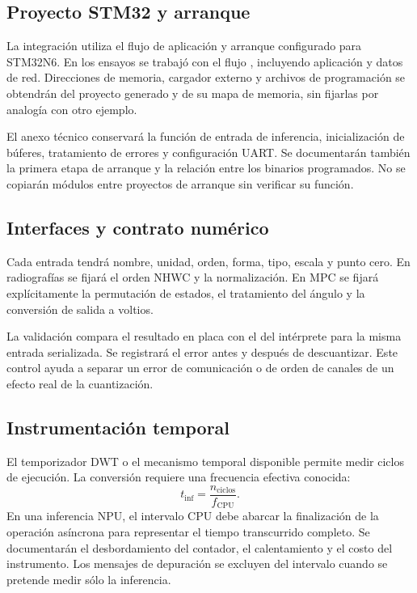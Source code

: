 \subsection{Proyecto STM32 y arranque}
La integración utiliza el flujo de aplicación y arranque configurado para STM32N6. En los ensayos se trabajó con el flujo , incluyendo aplicación y datos de red. Direcciones de memoria, cargador externo y archivos de programación se obtendrán del proyecto generado y de su mapa de memoria, sin fijarlas por analogía con otro ejemplo.

El anexo técnico conservará la función de entrada de inferencia, inicialización de búferes, tratamiento de errores y configuración UART. Se documentarán también la primera etapa de arranque y la relación entre los binarios programados. No se copiarán módulos entre proyectos de arranque sin verificar su función.

\subsection{Interfaces y contrato numérico}
Cada entrada tendrá nombre, unidad, orden, forma, tipo, escala y punto cero. En radiografías se fijará el orden NHWC y la normalización. En MPC se fijará explícitamente la permutación de estados, el tratamiento del ángulo y la conversión de salida a voltios.

La validación compara el resultado en placa con el del intérprete para la misma entrada serializada. Se registrará el error antes y después de descuantizar. Este control ayuda a separar un error de comunicación o de orden de canales de un efecto real de la cuantización.

\subsection{Instrumentación temporal}
El temporizador DWT o el mecanismo temporal disponible permite medir ciclos de ejecución. La conversión requiere una frecuencia efectiva conocida:
\begin{equation}t_{\mathrm{inf}}=\frac{n_{\mathrm{ciclos}}}{f_{\mathrm{CPU}}}.\end{equation}
En una inferencia NPU, el intervalo CPU debe abarcar la finalización de la operación asíncrona para representar el tiempo transcurrido completo. Se documentarán el desbordamiento del contador, el calentamiento y el costo del instrumento. Los mensajes de depuración se excluyen del intervalo cuando se pretende medir sólo la inferencia.

